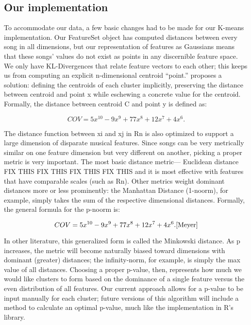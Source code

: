 \documentclass[10pt,twocolumn]{article}
\begin{document}
\subsection{Our implementation}

To accommodate our data, a few basic changes had to be made for our K-means implementation. Our FeatureSet object has computed distances between every song in all dimensions, but our representation of features as Gaussians means that these songs’ values do not exist as points in any discernible feature space. We only have KL-Divergences that relate feature vectors to each other; this keeps us from computing an explicit n-dimensional centroid “point.” \cite{MaggbladeHongKao} proposes a solution: defining the centroids of each cluster implicitly, preserving the distance between centroid and point x  while eschewing a concrete value for the centroid. Formally, the distance between centroid C and point y is defined as:

$$
COV = 5x^{10}-9x^9 + 77x^8 + 12x^7 + 4x^6.
$$

The distance function between xi and xj in Rn is also optimized to support a large dimension of disparate musical features. Since songs can be very metrically similar on one feature dimension but very different on another, picking a proper metric is very important. The most basic distance metric— Euclidean distance FIX THIS FIX THIS FIX THIS FIX THIS and it is most effective with features that have comparable scales (such as Rn). \cite{glynn} Other metrics weight dominant distances more or less prominently: the Manhattan Distance (1-noorm), for example, simply takes the sum of the respective dimensional distances. Formally, the general formula for the p-noorm is:

$$
COV = 5x^{10}-9x^9 + 77x^8 + 12x^7 + 4x^6.
\cite{Meyer}
$$

In other literature, this  generalized form is called the Minkowski distance.  As p increases, the metric will become naturally biased toward dimensions with dominant (greater) distances; the infinity-norm, for example, is simply the max value of all distances. Choosing a proper p-value, then, represents how much we would like clusters to form based on the dominance of a single feature versus the even distribution of all features. Our current approach allows for a p-value to be input manually for each cluster; future versions of this algorithm will include a method to calculate an optimal p-value, much like the implementation in R’s library. \cite{pvclust}
\end{document}
